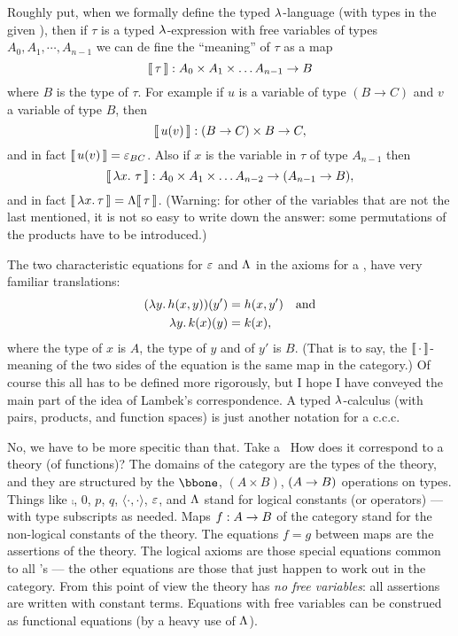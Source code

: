 Roughly put, when we formally define the typed $\lambda$-language (with types in the given \ccc), then if $\tau$ is a typed $\lambda$-expression with free variables of types $A_0, A_1,\cdots, A_{n-1}$ we can de fine the ``meaning'' of $\tau$ as a map
%
$$
\llbracket\, \tau \,\rrbracket: A_0 \times A_1 \times \dots A_{n-1} \rightarrow B
$$
%
where $B$ is the type of $\tau$. For example if $u$ is a variable of type $(B \to C)$ and $v$ a variable of type $B$, then
$$
\llbracket\, u(v) \,\rrbracket: (B \rightarrow C) \times B \rightarrow C,
$$
%
and in fact $\llbracket\, u(v) \,\rrbracket = \varepsilon_{BC}$. Also if $x$ is the variable in $\tau$ of type $A_{n-1}$ then
$$
\means{\lm{x}.\, \tau}: A_0 \times A_1 \times \dots A_{n-2} \to (A_{n-1} \to B),
$$
%
and in fact $\llbracket\, \lambda x.\, \tau \,\rrbracket = \Lambda\llbracket\, \tau \,\rrbracket$. (Warning: for other of the variables that are not the last mentioned, it is not so easy to write down the answer: some permutations of the products have to be introduced.)

The two characteristic equations for $\varepsilon$ and $\Lambda$ in the axioms for a \ccc, have very familiar translations:
\begin{align*}
( \lm{y}. h(x,y))(y') &= h(x,y') \quad {\textrm {and}} \\
\lm{y}. k(x)(y) &= k(x),
\end{align*}
%
where the type of $x$ is $A$, the type of $y$ and of $y'$ is $B$. (That is to say, the $\llbracket\, \cdot \,\rrbracket$-meaning of the two sides of the equation is
the same map in the category.) Of course this all has to be defined more rigorously, but I hope I have conveyed the main part of the idea of Lambek's correspondence. A typed $\lambda$-calculus (with pairs, products, and function spaces) is just another notation for a {c.c.c}.

No, we have to be more specitic than that. Take a \ccc\ How does it correspond to a theory (of functions)? The domains
of the category are the types of the theory, and they are structured by the $\bbone$, $(A \times B)$, $(A \rightarrow B)$ operations on types. Things like $\comp$,
$0$, $p$, $q$, $\langle\cdot,\cdot\rangle$, $\varepsilon$, and $\Lambda$ stand for logical constants (or operators) --- with type subscripts as needed. Maps $f : A \rightarrow B$ of the category stand for the non-logical constants of the theory.
The equations $f = g$ between maps are the assertions of the theory. The logical axioms are those special equations common to all \ccc's --- the other equations are those that just happen to work out in the category. From this point of view the theory has {\it no free variables}: all assertions are written with constant terms. Equations with free variables can be construed as functional equations (by a heavy use of $\Lambda$).

